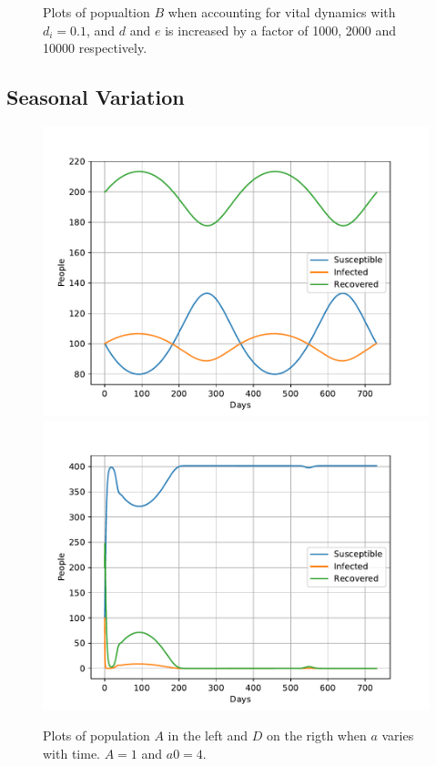 \documentclass[a4paper]{article}
\let\Oldsubsection\subsection
\renewcommand{\subsection}{\FloatBarrier\Oldsubsection}
\begin{document}
\begin{figure}[!htb]
	\caption{Plots of popualtion $B$  when accounting for vital dynamics with $d_i=0.1$, and $d$ and $e$ is increased by a factor of 1000, 2000 and 10000 respectively.}
	\label{opp_c2}
\end{figure}


\subsection{Seasonal Variation}

\begin{figure}[!htb]
	\centering 
	\includegraphics[scale=0.56]{../plots/opp_d_A.pdf}
	\includegraphics[scale=0.56]{../plots/opp_d_B.pdf}
	\caption{Plots of population $A$ in the left and $D$ on the rigth when $a$ varies with time. $A=1$ and $a0=4$.}
	\label{opp_d0}
\end{figure}
\end{document}
